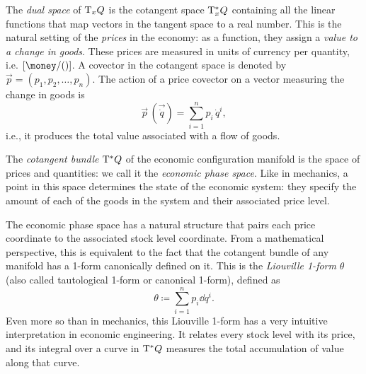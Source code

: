 The \emph{dual space} of \(\mathrm{T}_{x} Q\) is the cotangent space \(\mathrm{T}_{x}^*Q\) containing all the linear functions that map vectors in the tangent space to a real number. This is the natural setting of the \emph{prices} in the economy: as a function, they assign a \emph{value to a change in goods}. These prices are measured in units of currency per quantity, i.e. \(\qty[\si{\money \per \quantity}]\). A covector in the cotangent space is denoted by \(\vec{p} = (p_1, p_2, \ldots, p_n)\). The action of a price covector on a vector measuring the change in goods is
\begin{equation}
    \vec{p}\,(\vec{\dot{q}}) = \sum_{i = 1}^n p_i\,\dot{q}^i,
\end{equation}
i.e., it produces the total value associated with a flow of goods.


The \emph{cotangent bundle} \(\mathrm{T}^*Q\) of the economic configuration manifold is the space of prices and quantities: we call it the \emph{economic phase space}. Like in mechanics, a point in this space determines the state of the economic system: they specify the amount of each of the goods in the system and their associated price level.

The economic phase space has a natural structure that pairs each price coordinate to the associated stock level coordinate. From a mathematical perspective, this is equivalent to the fact that the cotangent bundle of any manifold has a 1-form canonically defined on it. This is the \emph{Liouville 1-form} $\theta$ (also called tautological 1-form or canonical 1-form), defined as
\begin{equation} 
    \theta \coloneq \sum_{i = 1}^n p_i \dd{q}^i.
\end{equation}
Even more so than in mechanics, this Liouville 1-form has a very intuitive interpretation in economic engineering. It relates every stock level with its price, and its integral over a curve in \(\mathrm{T}^*Q\) measures the total accumulation of value along that curve.

